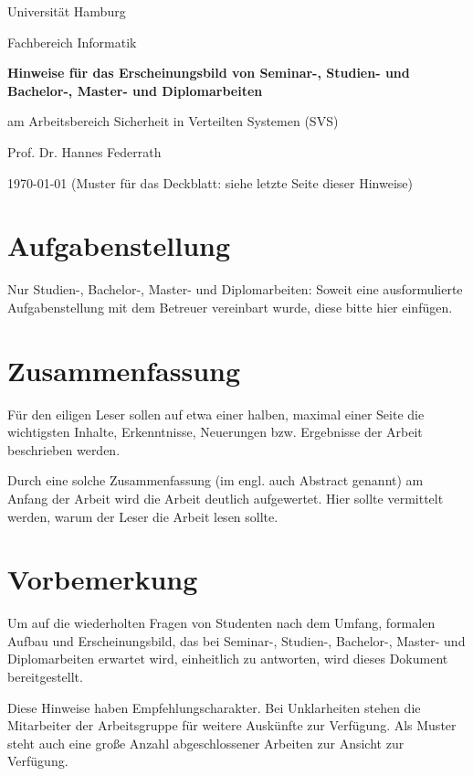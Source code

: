 \documentclass[12pt]{scrartcl}
\begin{document}
\newpage
\thispagestyle{empty}
\begin{center}\Large
Universität Hamburg \par
Fachbereich Informatik
\vfill
{\Large\textsf{\textbf{Hinweise für das Erscheinungsbild von Seminar-, Studien- und Bachelor-, Master- und Diplomarbeiten}}\par} 
\bigskip
am Arbeitsbereich Sicherheit in Verteilten Systemen (SVS) \par
\bigskip
Prof. Dr. Hannes Federrath \par
\bigskip
\today
\vfill
\vfill 
(Muster für das Deckblatt: siehe letzte Seite dieser Hinweise)
\end{center}

\newpage
\section*{Aufgabenstellung}

Nur Studien-, Bachelor-, Master- und Diplomarbeiten: Soweit eine ausformulierte Aufgabenstellung mit dem Betreuer vereinbart wurde, diese bitte hier einfügen.

\newpage
\section*{Zusammenfassung}

Für den eiligen Leser sollen auf etwa einer halben, maximal einer Seite die wichtigsten Inhalte, Erkenntnisse, Neuerungen bzw. Ergebnisse der Arbeit beschrieben werden. 

Durch eine solche Zusammenfassung (im engl. auch Abstract genannt) am Anfang der Arbeit wird die Arbeit deutlich aufgewertet. Hier sollte vermittelt werden, warum der Leser die Arbeit lesen sollte.

\newpage
\tableofcontents

\newpage
\section{Vorbemerkung}

Um auf die wiederholten Fragen von Studenten nach dem Umfang, formalen Aufbau und Erscheinungsbild, das bei Seminar-, Studien-, Bachelor-, Master- und Diplomarbeiten erwartet wird, einheitlich zu antworten, wird dieses Dokument bereitgestellt.

Diese Hinweise haben Empfehlungscharakter. Bei Unklarheiten stehen die Mitarbeiter der Arbeitsgruppe für weitere Auskünfte zur Verfügung. Als Muster steht auch eine große Anzahl abgeschlossener Arbeiten zur Ansicht zur Verfügung.
\end{document}
